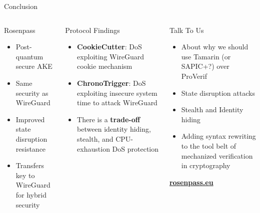 \begin{frame}{Conclusion}
\vspace{-\ht\strutbox}
  \begin{columns}[t]
    \begin{column}{.30\linewidth}
      \begin{block}{Rosenpass\strut}
      \begin{itemize}
      \item
        Post-quantum secure AKE
      \item
        Same security as WireGuard
      \item
        Improved state disruption resistance
      \item
        Transfers key to WireGuard for hybrid security
      \end{itemize}
      \end{block}
    \end{column}

    \begin{column}{.33\linewidth}
      \begin{block}{Protocol Findings\strut}
      \begin{itemize}
      \item
        \textbf{CookieCutter}: DoS exploiting WireGuard cookie mechanism
      \item
        \textbf{ChronoTrigger}: DoS exploiting insecure system time to attack WireGuard
      \item
        There is a \textbf{trade-off} between identity hiding, stealth, and
        CPU-exhaustion DoS protection
      \end{itemize}
      \end{block}
    \end{column}

    \begin{column}{.36\linewidth}
      \begin{block}{Talk To Us\strut}
      \begin{itemize}
      \item
        About why we should use Tamarin (or SAPIC+?) over ProVerif
      \item
        State disruption attacks
      \item
        Stealth and Identity hiding
      \item
        Adding syntax rewriting to the tool belt of mechanized verification in
        cryptography
      \end{itemize}
      \vspace{2em}
      \hfill\textbf{\url{rosenpass.eu}}
      \end{block}
    \end{column}
  \end{columns}
\end{frame}


